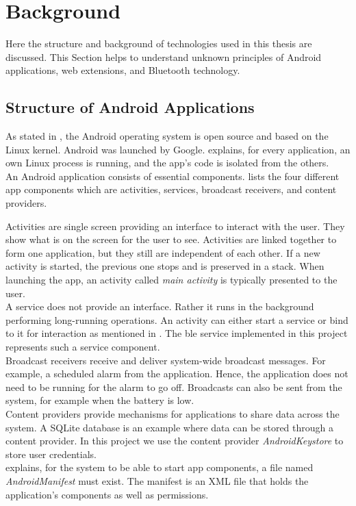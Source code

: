 \section{Background} \label{background}
Here the structure and background of technologies used in this thesis are discussed. This Section helps to understand unknown principles of Android applications, web extensions, and Bluetooth technology.

\subsection{Structure of Android Applications}
As stated in \cite{liu2011research}, the Android operating system is open source and based on the Linux kernel. Android was launched by Google. \cite{AndroidFundamentals} explains, for every application, an own Linux process is running, and the app's code is isolated from the others. \\
An Android application consists of essential components.  \cite{liu2011research} lists the four different app components which are activities, services, broadcast receivers, and content providers.

Activities are single screen providing an interface to interact with the user. They show what is on the screen for the user to see. Activities are linked together to form one application, but they still are independent of each other. If a new activity is started, the previous one stops and is preserved in a stack. When launching the app, an activity called \textit{main activity} is typically presented to the user. \\
A service does not provide an interface. Rather it runs in the background performing long-running operations. An activity can either start a service or bind to it for interaction as mentioned in \cite{AndroidFundamentals}. The \gls{ble} service implemented in this project represents such a service component. \\
Broadcast receivers receive and deliver system-wide broadcast messages. For example, a scheduled alarm from the application. Hence, the application does not need to be running for the alarm to go off. Broadcasts can also be sent from the system, for example when the battery is low. \\
Content providers provide mechanisms for applications to share data across the system. A SQLite database is an example where data can be stored through a content provider. In this project we use the content provider \textit{AndroidKeystore} to store user credentials. \\
\cite{AndroidFundamentals} explains, for the system to be able to start app components, a file named \textit{AndroidManifest} must exist. The manifest is an XML file that holds the application's components as well as permissions.



